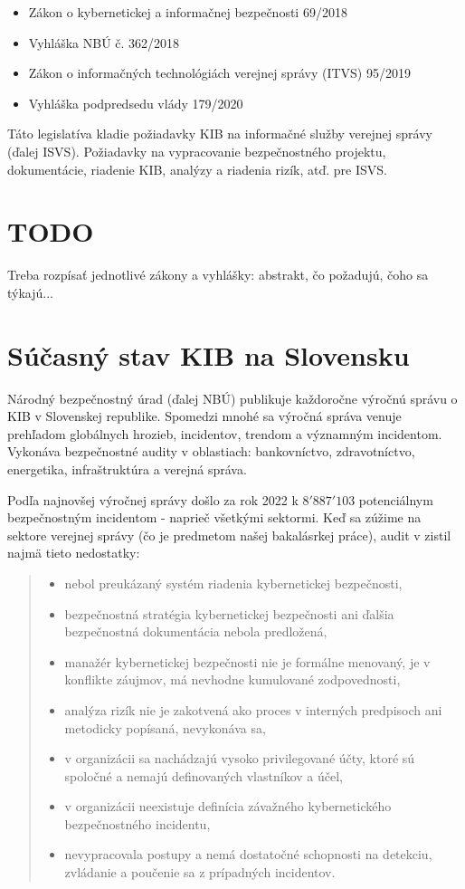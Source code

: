 \begin{itemize}
  \item Zákon o kybernetickej a informačnej bezpečnosti 69/2018
  \item Vyhláška NBÚ č. 362/2018
  \item Zákon o informačných technológiách verejnej správy (ITVS) 95/2019
  \item Vyhláška podpredsedu vlády 179/2020
\end{itemize}

Táto legislatíva kladie požiadavky KIB na informačné služby verejnej správy (ďalej ISVS). Požiadavky na 
vypracovanie bezpečnostného projektu, dokumentácie, riadenie KIB, analýzy a riadenia rizík, atď. pre ISVS. 

\section*{TODO} 
Treba rozpísať jednotlivé zákony a vyhlášky: abstrakt, čo požadujú, čoho sa týkajú...

  \section{Súčasný stav KIB na Slovensku}
Národný bezpečnostný úrad (ďalej NBÚ) publikuje každoročne výročnú správu o KIB v Slovenskej republike. Spomedzi mnohé 
sa výročná správa venuje prehľadom globálnych hrozieb, incidentov, trendom a významným incidentom. Vykonáva bezpečnostné
audity v oblastiach: bankovníctvo, zdravotníctvo, energetika, infraštruktúra a verejná správa.

Podľa najnovšej výročnej správy \cite{KIBSK22} došlo za rok 2022 k $8'887'103$ potenciálnym bezpečnostným incidentom - naprieč všetkými sektormi. Keď sa zúžime na sektore verejnej správy (čo je predmetom našej bakalásrkej práce), audit v zistil
najmä tieto nedostatky: 

\begin{quote}
  \begin{itemize}
    \item nebol preukázaný systém riadenia kybernetickej bezpečnosti,
    \item bezpečnostná stratégia kybernetickej bezpečnosti ani ďalšia bezpečnostná dokumentácia nebola predložená,
    \item manažér kybernetickej bezpečnosti nie je formálne menovaný, je v konflikte záujmov, má nevhodne kumulované zodpovednosti,
    \item analýza rizík nie je zakotvená ako proces v interných predpisoch ani metodicky popísaná, nevykonáva sa,
    \item v organizácii sa nachádzajú vysoko privilegované účty, ktoré sú spoločné a nemajú definovaných vlastníkov a účel,
    \item v organizácii neexistuje definícia závažného kybernetického bezpečnostného incidentu,
    \item nevypracovala postupy a nemá dostatočné schopnosti na detekciu, zvládanie a poučenie sa z prípadných incidentov.
  \end{itemize}
\end{quote}

